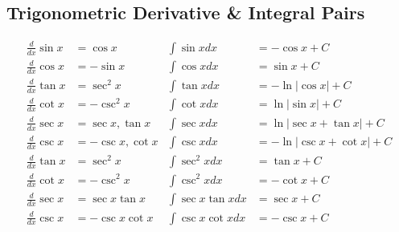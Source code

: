 \documentclass{article}
\begin{document}
\newpage

\begin{multicols}{2}
\section*{Trigonometric Derivative \& Integral Pairs}

\begin{align*}
\frac{d}{dx}\sin x &= \cos x
&\int \sin x dx &= -\cos x + C
\\[6pt]
\frac{d}{dx}\cos x &= -\sin x
&\int \cos x dx &= \sin x + C
\\[6pt]
\frac{d}{dx}\tan x &= \sec^2 x
&\int \tan x dx &= -\ln\lvert\cos x\rvert + C
\\[6pt]
\frac{d}{dx}\cot x &= -\csc^2 x
&\int \cot x dx &= \ln\lvert\sin x\rvert + C
\\[6pt]
\frac{d}{dx}\sec x &= \sec x,\tan x
&\int \sec x dx &= \ln\bigl\lvert\sec x+\tan x\bigr\rvert + C
\\[6pt]
\frac{d}{dx}\csc x &= -\csc x,\cot x
&\int \csc x dx &= -\ln\bigl\lvert\csc x+\cot x\bigr\rvert + C
\\[10pt]
\frac{d}{dx}\tan x &= \sec^2 x
&\int \sec^2 x dx &= \tan x + C
\\[6pt]
\frac{d}{dx}\cot x &= -\csc^2 x
&\int \csc^2 x dx &= -\cot x + C
\\[6pt]
\frac{d}{dx}\sec x &= \sec x\tan x
&\int \sec x\tan x dx &= \sec x + C
\\[6pt]
\frac{d}{dx}\csc x &= -\csc x\cot x
&\int \csc x\cot x dx &= -\csc x + C
\\[10pt]
\end{align*}

\columnbreak


\end{multicols}
\end{document}
